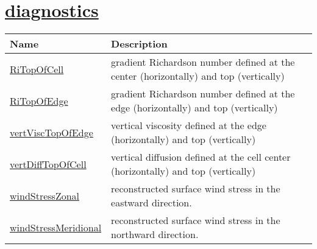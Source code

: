 \section[diagnostics]{\hyperref[sec:var_sec_diagnostics]{diagnostics}}
\label{sec:var_tab_diagnostics}

{\small
\begin{center}
\begin{longtable}{| p{2.0in} | p{4.0in} |}
	\hline
	{\bf Name} & {\bf Description} \\
	\hline
	\hyperref[subsec:var_sec_diagnostics_RiTopOfCell]{RiTopOfCell} & gradient Richardson number defined at the center (horizontally) and top (vertically) \\
	\hline
	\hyperref[subsec:var_sec_diagnostics_RiTopOfEdge]{RiTopOfEdge} & gradient Richardson number defined at the edge (horizontally) and top (vertically) \\
	\hline
	\hyperref[subsec:var_sec_diagnostics_vertViscTopOfEdge]{vertViscTopOfEdge} & vertical viscosity defined at the edge (horizontally) and top (vertically) \\
	\hline
	\hyperref[subsec:var_sec_diagnostics_vertDiffTopOfCell]{vertDiffTopOfCell} & vertical diffusion defined at the cell center (horizontally) and top (vertically) \\
	\hline
	\hyperref[subsec:var_sec_diagnostics_windStressZonal]{windStressZonal} & reconstructed surface wind stress in the eastward direction. \\
	\hline
	\hyperref[subsec:var_sec_diagnostics_windStressMeridional]{windStressMeridional} & reconstructed surface wind stress in the northward direction. \\
	\hline
\end{longtable}
\end{center}
}

